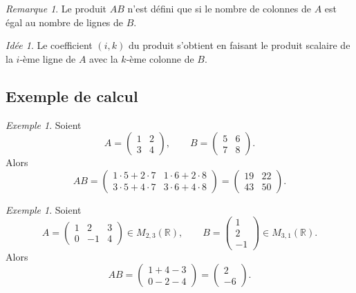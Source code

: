 \documentclass[11pt,a4paper]{article}
\theoremstyle{remark}
\newtheorem{remarque}[definition]{Remarque}
\newtheorem{exemple}[definition]{Exemple}
\newtheorem*{idee}{Idée}
\newcommand{\R}{\mathbb{R}}
\begin{document}
\begin{remarque}
Le produit \(AB\) n’est défini que si le nombre de colonnes de \(A\) est égal au nombre de lignes de \(B\).
\end{remarque}

\begin{idee}
Le coefficient \((i,k)\) du produit s’obtient en faisant le produit scalaire de la \(i\)-ème ligne de \(A\) avec la \(k\)-ème colonne de \(B\).
\end{idee}

\subsection{Exemple de calcul}

\begin{exemple}
Soient
\[
A=
\begin{pmatrix}
1 & 2\\
3 & 4
\end{pmatrix},
\qquad
B=
\begin{pmatrix}
5 & 6\\
7 & 8
\end{pmatrix}.
\]
Alors
\[
AB=
\begin{pmatrix}
1\cdot 5+2\cdot 7 & 1\cdot 6+2\cdot 8\\
3\cdot 5+4\cdot 7 & 3\cdot 6+4\cdot 8
\end{pmatrix}
=
\begin{pmatrix}
19 & 22\\
43 & 50
\end{pmatrix}.
\]
\end{exemple}

\begin{exemple}
Soient
\[
A=
\begin{pmatrix}
1 & 2 & 3\\
0 & -1 & 4
\end{pmatrix}
\in M_{2,3}(\R),
\qquad
B=
\begin{pmatrix}
1\\
2\\
-1
\end{pmatrix}
\in M_{3,1}(\R).
\]
Alors
\[
AB=
\begin{pmatrix}
1+4-3\\
0-2-4
\end{pmatrix}
=
\begin{pmatrix}
2\\
-6
\end{pmatrix}.
\]
\end{exemple}
\end{document}
